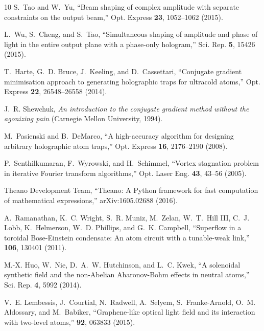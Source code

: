 \documentclass[amsmath,onecolumn,superscriptaddress,notitlepage]{revtex4-1}
\begin{document}
\begin{thebibliography}{10}
S.~Tao and W.~Yu, \enquote{Beam shaping of complex amplitude with separate
  constraints on the output beam,} Opt. Express \textbf{23}, 1052--1062 (2015).

L.~Wu, S.~Cheng, and S.~Tao, \enquote{Simultaneous shaping of amplitude and
  phase of light in the entire output plane with a phase-only hologram,} Sci.
  Rep. \textbf{5}, 15426 (2015).

T.~Harte, G.~D. Bruce, J.~Keeling, and D.~Cassettari, \enquote{Conjugate
  gradient minimisation approach to generating holographic traps for ultracold
  atoms,} Opt. Express \textbf{22}, 26548--26558 (2014).

J.~R. Shewchuk, \emph{An introduction to the conjugate gradient method without
  the agonizing pain} (Carnegie Mellon University, 1994).

M.~Pasienski and B.~DeMarco, \enquote{A high-accuracy algorithm for designing
  arbitrary holographic atom traps,} Opt. Express \textbf{16}, 2176--2190 (2008).
  
P.~Senthilkumaran, F.~Wyrowski, and H.~Schimmel, \enquote{Vortex stagnation problem in iterative Fourier transform algorithms,} Opt. Laser Eng. \textbf{43}, 43--56 (2005). 

Theano Development Team, \enquote{{Theano: A Python framework for fast computation of mathematical expressions,}} arXiv:1605.02688 (2016).


A.~Ramanathan, K.~C. Wright, S.~R. Muniz, M.~Zelan, W.~T.~Hill III, C.~J. Lobb,
  K.~Helmerson, W.~D. Phillips, and G.~K. Campbell, \enquote{Superflow in a
  toroidal Bose-Einstein condensate: An atom circuit with a tunable-weak link,}
  \prl \textbf{106}, 130401 (2011).

M.-X. Huo, W.~Nie, D.~A.~W. Hutchinson, and L.~C. Kwek, \enquote{A solenoidal
  synthetic field and the non-Abelian Aharonov-Bohm effects in neutral atoms,}
  Sci. Rep. \textbf{4}, 5992 (2014).

V.~E. Lembessis, J.~Courtial, N.~Radwell, A.~Selyem, S.~Franke-Arnold, O.~M.
  Aldossary, and M.~Babiker, \enquote{Graphene-like optical light field and its
  interaction with two-level atoms,} \pra \textbf{92}, 063833 (2015).


\end{thebibliography}
\end{document}
